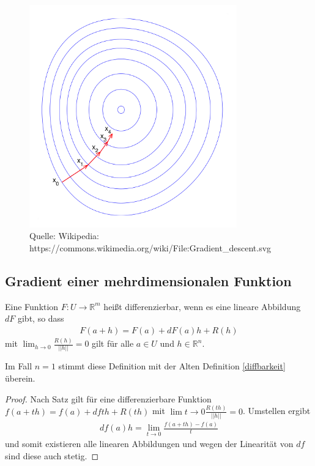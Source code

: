 \begin{figure}[H]
      \centering
    \includegraphics[width=0.8\textwidth]{images/Gradient_descent}
      \caption{Quelle: Wikipedia: https://commons.wikimedia.org/wiki/File:Gradient\_descent.svg}
\end{figure}



\subsection{Gradient einer  mehrdimensionalen Funktion}
\begin{Definition}
\label{diffbarkeitmd}
Eine Funktion $F: U \to \mathbb{R}^m$ heißt differenzierbar, wenn es eine lineare Abbildung $dF$ gibt, so dass 
\begin{align*}
F(a + h) = F(a) + dF(a)h + R(h)
\end{align*}
mit $\lim_{h \to 0} \frac{R(h)}{||h||} = 0$ gilt für alle $a \in U$ und $h \in \mathbb{R}^n$.
\end{Definition}

\begin{Bemerkung}
Im Fall $n = 1$ stimmt diese Definition mit der Alten Definition \ref{diffbarkeit} überein.
\end{Bemerkung}
\begin{proof}
Nach Satz \label{lokaleLinearisierung} gilt für eine differenzierbare Funktion $f(a + th) = f(a) + df th + R(th)$ mit  $\lim{t \to 0} \frac{R(th)}{||h||} = 0$. Umstellen ergibt
\begin{align*}
df(a) h = \lim_{t \to 0} \frac{f(a + th) - f(a)}{t}
\end{align*} 
und somit existieren alle linearen Abbildungen und wegen der Linearität von $df$ sind diese auch stetig.
\end{proof}

